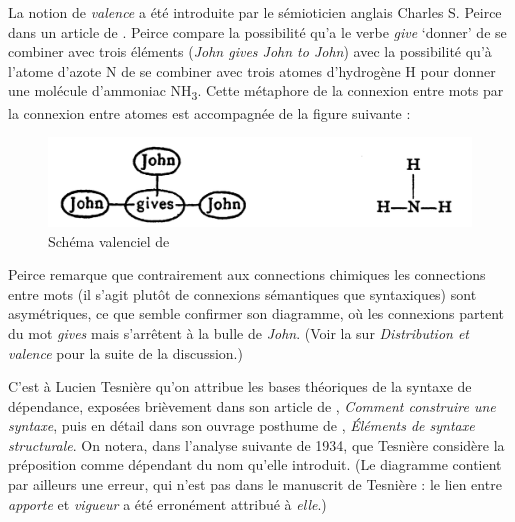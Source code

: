 {    La notion de \textit{valence} a été introduite par le sémioticien anglais Charles S. Peirce dans un article de \citeyear{peirce1897logic}. Peirce compare la possibilité qu’a le verbe \textit{give} ‘donner’ de se combiner avec trois éléments (\textit{John gives John to John}) avec la possibilité qu’à l’atome d’azote N de se combiner avec trois atomes d’hydrogène H pour donner une molécule d’ammoniac NH\textsubscript{3}. Cette métaphore de la connexion entre mots par la connexion entre atomes est accompagnée de la figure suivante :

    \begin{figure}[H]
    \caption{Schéma valenciel de \citet{Peirce1897}}
    \includegraphics[width=\textwidth]{figures/vol1syntaxe2-img016.png}
    \end{figure}

    Peirce remarque que contrairement aux connections chimiques les connections entre mots (il s’agit plutôt de connexions sémantiques que syntaxiques) sont asymétriques, ce que semble confirmer son diagramme, où les connexions partent du mot \textit{gives} mais s’arrêtent à la bulle de \textit{John}. (Voir la  sur \textit{Distribution et valence} pour la suite de la discussion.)

    C’est à Lucien Tesnière qu’on attribue les bases théoriques de la syntaxe de dépendance, exposées brièvement dans son article de \citeyear{tesniere1934comment}, \textit{Comment construire une syntaxe}, puis en détail dans son ouvrage posthume de \citeyear{tesniere1959elements}, \textit{Éléments de syntaxe structurale}. On notera, dans l’analyse suivante de 1934, que Tesnière considère la préposition comme dépendant du nom qu’elle introduit. (Le diagramme contient par ailleurs une erreur, qui n’est pas dans le manuscrit de Tesnière : le lien entre \textit{apporte} et \textit{vigueur} a été erronément attribué à \textit{elle}.)

}
